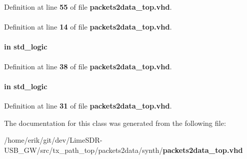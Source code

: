Definition at line {\bf 55} of file {\bf packets2data\+\_\+top.\+vhd}.

\paragraph[{std\+\_\+logic\+\_\+1164}]{\hspace{0.3cm}{\ttfamily [Package]}}\label{classpackets2data__top_acd03516902501cd1c7296a98e22c6fcb}


Definition at line {\bf 14} of file {\bf packets2data\+\_\+top.\+vhd}.

\paragraph[{trxiqpulse}]{ {\bfseries \textcolor{keywordflow}{in}\textcolor{vhdlchar}{ }} {\bfseries \textcolor{comment}{std\+\_\+logic}\textcolor{vhdlchar}{ }} \hspace{0.3cm}{\ttfamily [Port]}}\label{classpackets2data__top_a808d6d382f3c6a02784a160f67d0f891}


Definition at line {\bf 38} of file {\bf packets2data\+\_\+top.\+vhd}.

\paragraph[{wclk}]{ {\bfseries \textcolor{keywordflow}{in}\textcolor{vhdlchar}{ }} {\bfseries \textcolor{comment}{std\+\_\+logic}\textcolor{vhdlchar}{ }} \hspace{0.3cm}{\ttfamily [Port]}}\label{classpackets2data__top_adc5d3b386b1979488fb85997e33fbd78}


Definition at line {\bf 31} of file {\bf packets2data\+\_\+top.\+vhd}.



The documentation for this class was generated from the following file\+:\begin{DoxyCompactItemize}
\item 
/home/erik/git/dev/\+Lime\+S\+D\+R-\/\+U\+S\+B\+\_\+\+G\+W/src/tx\+\_\+path\+\_\+top/packets2data/synth/{\bf packets2data\+\_\+top.\+vhd}\end{DoxyCompactItemize}
